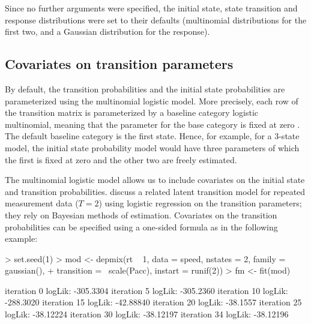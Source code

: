 \documentclass[article]{jss}
\begin{document}
Since no further arguments were specified, the initial state, state
transition and response distributions were set to their defaults
(multinomial distributions for the first two, and a Gaussian
distribution for the response).

\subsection{Covariates on transition parameters\label{sec:trans}}

By default, the transition probabilities and the initial state
probabilities are parameterized using the multinomial logistic model.
More precisely, each row of the transition matrix is parameterized by
a baseline category logistic multinomial, meaning that the parameter
for the base category is fixed at zero \citep[see][p.\ 267 ff., for
multinomial logistic models and various
parameterizations]{Agresti2002}.  The default baseline category is the
first state.  Hence, for example, for a 3-state model, the initial
state probability model would have three parameters of which the first
is fixed at zero and the other two are freely estimated.

The multinomial logistic model allows us to include covariates on the
initial state and transition probabilities.  \citet{Chung2007} discuss
a related latent transition model for repeated measurement data
($T=2$) using logistic regression on the transition parameters; they
rely on Bayesian methods of estimation.  Covariates on the transition
probabilities can be specified using a one-sided formula as in the
following example:
\begin{Schunk}
\begin{Sinput}
> set.seed(1)
> mod <- depmix(rt ~ 1, data = speed, nstates = 2, family = gaussian(), 
+     transition = ~scale(Pacc), instart = runif(2))
> fm <- fit(mod)
\end{Sinput}
\begin{Soutput}
iteration 0 logLik: -305.3304 
iteration 5 logLik: -305.2360 
iteration 10 logLik: -288.3020 
iteration 15 logLik: -42.88840 
iteration 20 logLik: -38.1557 
iteration 25 logLik: -38.12224 
iteration 30 logLik: -38.12197 
iteration 34 logLik: -38.12196 
\end{Soutput}
\end{Schunk}
\end{document}
